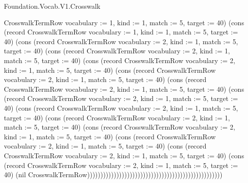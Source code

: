 \begin{lexlean}{Foundation.Vocab.V1.Crosswalk}
\begin{semanticmodule}
{CrosswalkTermRow {vocabulary := 1, kind := 1, match := 5, target := 40}) (cons (record CrosswalkTermRow {vocabulary := 1, kind := 1, match := 5, target := 40}) (cons (record CrosswalkTermRow {vocabulary := 2, kind := 1, match := 5, target := 40}) (cons (record CrosswalkTermRow {vocabulary := 2, kind := 1, match := 5, target := 40}) (cons (record CrosswalkTermRow {vocabulary := 2, kind := 1, match := 5, target := 40}) (cons (record CrosswalkTermRow {vocabulary := 2, kind := 1, match := 5, target := 40}) (cons (record CrosswalkTermRow {vocabulary := 2, kind := 1, match := 5, target := 40}) (cons (record CrosswalkTermRow {vocabulary := 2, kind := 1, match := 5, target := 40}) (cons (record CrosswalkTermRow {vocabulary := 2, kind := 1, match := 5, target := 40}) (cons (record CrosswalkTermRow {vocabulary := 2, kind := 1, match := 5, target := 40}) (cons (record CrosswalkTermRow {vocabulary := 2, kind := 1, match := 5, target := 40}) (cons (record CrosswalkTermRow {vocabulary := 2, kind := 1, match := 5, target := 40}) (cons (record CrosswalkTermRow {vocabulary := 2, kind := 1, match := 5, target := 40}) (cons (record CrosswalkTermRow {vocabulary := 2, kind := 1, match := 5, target := 40}) (nil CrosswalkTermRow)))))))))))))))))))))))))))))))))))))))))))))))))))
}


\end{semanticmodule}
\end{lexlean}
